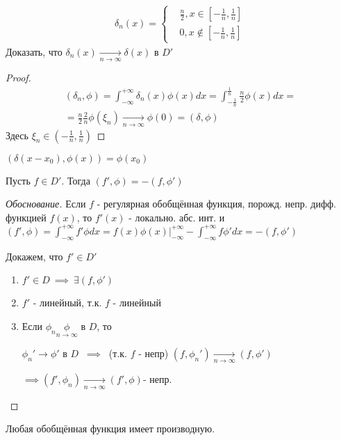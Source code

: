 \documentclass{article}
\begin{document}
\begin{eg}
  \begin{gather*}
    \delta_n(x)=\left\{\begin{aligned}
      & \frac{n}{2}, x \in [-\frac{1}{n},\frac{1}{n}] \\ 
      & 0, x \not \in [-\frac{1}{n},\frac{1}{n}]
    \end{aligned}\right.
  \end{gather*}
  Доказать, что $\delta_n(x) \underset{n\to\infty}{\to}\delta(x)$ в $D'$
  \begin{proof}
    \begin{gather*}
      (\delta_n,\phi)=\int_{-\infty}^{+\infty}\delta_n(x)\phi(x)dx=\int_{-\frac{1}{n}}^{\frac{1}{n}}\frac{n}{2}\phi(x)dx = \\ 
      = \frac{n}{2}\frac{2}{n}\phi(\xi_n)\underset{n\to\infty}{\to}\phi(0)=(\delta,\phi)
    \end{gather*}
    Здесь $\xi_n\in(-\frac{1}{n},\frac{1}{n})$
  \end{proof}
\end{eg}
\begin{definition}
  $(\delta(x-x_0),\phi(x))=\phi(x_0)$
\end{definition}
\begin{definition}
  Пусть $f\in D'$. Тогда $(f',\phi)=-(f,\phi')$
\end{definition}
\begin{proof}[Обоснование]
  Если $f$ - регулярная обобщённая функция, порожд. непр. дифф. функцией $f(x)$, то
  $f'(x)$ - локально. абс. инт. и $(f',\phi)=\int_{-\infty}^{+\infty}f'\phi dx=f(x)\phi(x)\big|_{-\infty}^{+\infty}-\int_{-\infty}^{+\infty}f\phi' dx = -(f,\phi')$

  Докажем, что $f'\in D'$

  \begin{enumerate}
    \item $f' \in D \ \implies \ \exists (f,\phi')$
    \item $f'$ - линейный, т.к. $f$ - линейный
    \item Если $\phi_n \underset{n\to\infty}{\phi}$ в $D$, то

      $\phi_n' \to \phi'$ в $D$ $\ \implies \ $ (т.к. $f$ - непр) $(f,\phi_n')\underset{n\to\infty}{\to}(f,\phi')$ 

      $\implies (f',\phi_n)\underset{n\to\infty}{\to}(f',\phi)$- непр.
  \end{enumerate}
\end{proof}
\begin{remark}
  Любая обобщённая функция имеет производную.
\end{remark}
\end{document}
